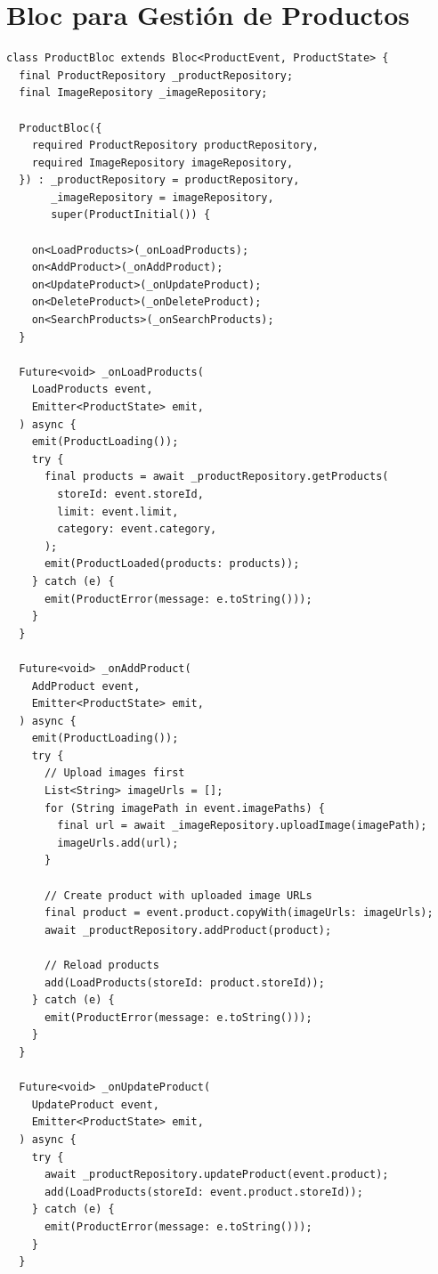 \documentclass[12pt,a4paper]{report}
\begin{document}
\section{Bloc para Gestión de Productos}

\begin{verbatim}
class ProductBloc extends Bloc<ProductEvent, ProductState> {
  final ProductRepository _productRepository;
  final ImageRepository _imageRepository;
  
  ProductBloc({
    required ProductRepository productRepository,
    required ImageRepository imageRepository,
  }) : _productRepository = productRepository,
       _imageRepository = imageRepository,
       super(ProductInitial()) {
    
    on<LoadProducts>(_onLoadProducts);
    on<AddProduct>(_onAddProduct);
    on<UpdateProduct>(_onUpdateProduct);
    on<DeleteProduct>(_onDeleteProduct);
    on<SearchProducts>(_onSearchProducts);
  }
  
  Future<void> _onLoadProducts(
    LoadProducts event,
    Emitter<ProductState> emit,
  ) async {
    emit(ProductLoading());
    try {
      final products = await _productRepository.getProducts(
        storeId: event.storeId,
        limit: event.limit,
        category: event.category,
      );
      emit(ProductLoaded(products: products));
    } catch (e) {
      emit(ProductError(message: e.toString()));
    }
  }
  
  Future<void> _onAddProduct(
    AddProduct event,
    Emitter<ProductState> emit,
  ) async {
    emit(ProductLoading());
    try {
      // Upload images first
      List<String> imageUrls = [];
      for (String imagePath in event.imagePaths) {
        final url = await _imageRepository.uploadImage(imagePath);
        imageUrls.add(url);
      }
      
      // Create product with uploaded image URLs
      final product = event.product.copyWith(imageUrls: imageUrls);
      await _productRepository.addProduct(product);
      
      // Reload products
      add(LoadProducts(storeId: product.storeId));
    } catch (e) {
      emit(ProductError(message: e.toString()));
    }
  }
  
  Future<void> _onUpdateProduct(
    UpdateProduct event,
    Emitter<ProductState> emit,
  ) async {
    try {
      await _productRepository.updateProduct(event.product);
      add(LoadProducts(storeId: event.product.storeId));
    } catch (e) {
      emit(ProductError(message: e.toString()));
    }
  }
  

\end{verbatim}
\end{document}
